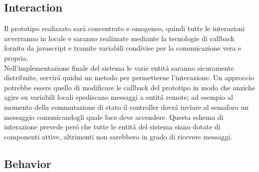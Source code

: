 \documentclass{llncs}
\begin{document}
\subsection{Interaction}
Il prototipo realizzato sar\'a concentrato e omogeneo, quindi tutte le interazioni avverranno in locale e saranno realizzate mediante la tecnologie di callback fornita da javascript e tramite variabili condivise per la comunicazione vera e propria. \\
Nell'implementazione finale del sistema le varie entit\'a saranno sicuramente distribuite, servir\'a quidni un metodo per permetterne l'interazione. Un approccio potrebbe essere quello di modificare le callback del prototipo in modo che anziche agire su variabili locali spediscano messaggi a entit\'a remote; ad esempio al momento della commutazione di stato il controller dovr\'a inviare al semaforo un messaggio comunicandogli quale luce deve accendere. Questa schema di interazione prevede per\'o che tutte le entit\'a del sistema siano dotate di componenti attive, altrimenti non sarebbero in grado di ricevere messaggi.\\

\subsection{Behavior}

\end{document}

